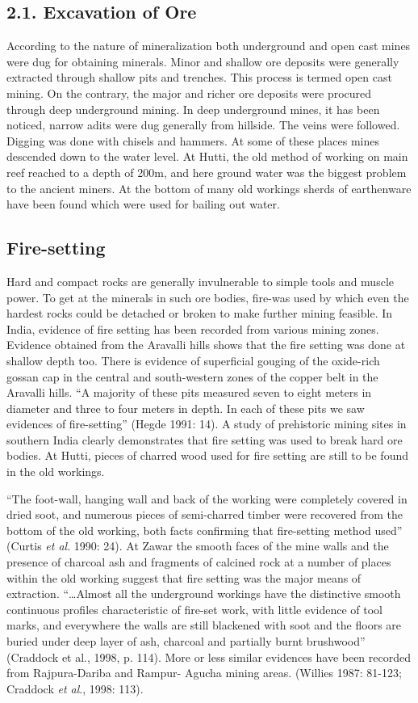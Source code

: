 \subsection*{2.1. Excavation of Ore}

According to the nature of mineralization both underground and open cast mines were dug for obtaining minerals. Minor and shallow ore deposits were generally extracted through shallow pits and trenches. This process is termed open cast mining. On the contrary, the major and richer ore deposits were procured through deep underground mining. In deep underground mines, it has been noticed, narrow adits were dug generally from hillside. The veins were followed. Digging was done with chisels and hammers. At some of these places mines descended down to the water level. At Hutti, the old method of working on main reef reached to a depth of 200m, and here ground water was the biggest problem to the ancient miners. At the bottom of many old workings sherds of earthenware have been found which were used for bailing out water.


\subsection*{Fire-setting}

Hard and compact rocks are generally invulnerable to simple tools and muscle power. To get at the minerals in such ore bodies, fire-was used by which even the hardest rocks could be detached or broken to make further mining feasible. In India, evidence of fire setting has been recorded from various mining zones. Evidence obtained from the Aravalli hills shows that the fire setting was done at shallow depth too. There is evidence of superficial gouging of the oxide-rich gossan cap in the central and south-western zones of the copper belt in the Aravalli hills. “A majority of these pits measured seven to eight meters in diameter and three to four meters in depth. In each of these pits we saw evidences of fire-setting” (Hegde 1991: 14). A study of prehistoric mining sites in southern India clearly demonstrates that fire setting was used to break hard ore bodies. At Hutti, pieces of charred wood used for fire setting are still to be found in the old workings.

“The foot-wall, hanging wall and back of the working were completely covered in dried soot, and numerous pieces of semi-charred timber were recovered from the bottom of the old working, both facts confirming that fire-setting method used” (Curtis \textit{et al}. 1990: 24). At Zawar the smooth faces of the mine walls and the presence of charcoal ash and fragments of calcined rock at a number of places within the old working suggest that fire setting was the major means of extraction. “…Almost all the underground workings have the distinctive smooth continuous profiles characteristic of fire-set work, with little evidence of tool marks, and everywhere the walls are still blackened with soot and the floors are buried under deep layer of ash, charcoal and partially burnt brushwood” (Craddock et al., 1998, p. 114). More or less similar evidences have been recorded from Rajpura-Dariba and Rampur- Agucha mining areas. (Willies 1987: 81-123; Craddock \textit{et al}., 1998: 113).


